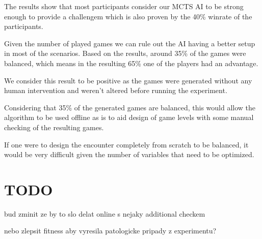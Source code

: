 The results show that most participants consider our MCTS AI to be strong
enough to provide a challengem which is also proven by the 40\% winrate of
the participants. 

Given the number of played games  we can
rule out the AI having a better setup in most of the scenarios. Based on the
results, around 35\%  of the games were balanced,
which means in the resulting 65\% one of the players had an advantage.

We consider this result to be positive as the games were generated without
any human intervention and weren't altered before running the experiment.

Considering that 35\% of the generated games are balanced, this would allow
the algorithm to be used offline as is to aid design of game levels with
some manual checking of the resulting games.

If one were to design the encounter completely from scratch to be balanced,
it would be very difficult given the number of variables that need to be
optimized.

\section{TODO}

\begin{description}[align=right,labelwidth=3cm]
\item bud zminit ze by to slo delat online s nejaky additional checkem
\item nebo zlepsit fitness aby vyresila patologicke pripady z experimentu?
\end{description}

